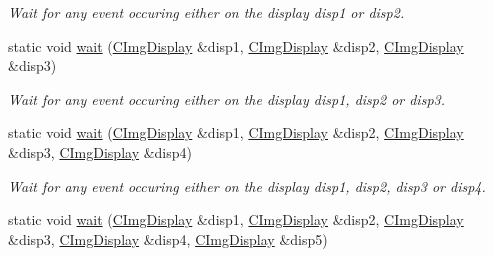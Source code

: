 \begin{DoxyCompactItemize}
\begin{DoxyCompactList}\small\item\em Wait for any event occuring either on the display {\ttfamily disp1} or {\ttfamily disp2}. \item\end{DoxyCompactList}\item 
\hypertarget{structcimg__library_1_1CImgDisplay_ace751dd163a5ea476947bcad5554035e}{
static void \hyperlink{structcimg__library_1_1CImgDisplay_ace751dd163a5ea476947bcad5554035e}{wait} (\hyperlink{structcimg__library_1_1CImgDisplay}{CImgDisplay} \&disp1, \hyperlink{structcimg__library_1_1CImgDisplay}{CImgDisplay} \&disp2, \hyperlink{structcimg__library_1_1CImgDisplay}{CImgDisplay} \&disp3)}
\label{structcimg__library_1_1CImgDisplay_ace751dd163a5ea476947bcad5554035e}

\begin{DoxyCompactList}\small\item\em Wait for any event occuring either on the display {\ttfamily disp1}, {\ttfamily disp2} or {\ttfamily disp3}. \item\end{DoxyCompactList}\item 
\hypertarget{structcimg__library_1_1CImgDisplay_a78ac24c082d4eb13d127374a4bf64987}{
static void \hyperlink{structcimg__library_1_1CImgDisplay_a78ac24c082d4eb13d127374a4bf64987}{wait} (\hyperlink{structcimg__library_1_1CImgDisplay}{CImgDisplay} \&disp1, \hyperlink{structcimg__library_1_1CImgDisplay}{CImgDisplay} \&disp2, \hyperlink{structcimg__library_1_1CImgDisplay}{CImgDisplay} \&disp3, \hyperlink{structcimg__library_1_1CImgDisplay}{CImgDisplay} \&disp4)}
\label{structcimg__library_1_1CImgDisplay_a78ac24c082d4eb13d127374a4bf64987}

\begin{DoxyCompactList}\small\item\em Wait for any event occuring either on the display {\ttfamily disp1}, {\ttfamily disp2}, {\ttfamily disp3} or {\ttfamily disp4}. \item\end{DoxyCompactList}\item 
\hypertarget{structcimg__library_1_1CImgDisplay_a205f86fcf436778bf3219c8163d33425}{
static void \hyperlink{structcimg__library_1_1CImgDisplay_a205f86fcf436778bf3219c8163d33425}{wait} (\hyperlink{structcimg__library_1_1CImgDisplay}{CImgDisplay} \&disp1, \hyperlink{structcimg__library_1_1CImgDisplay}{CImgDisplay} \&disp2, \hyperlink{structcimg__library_1_1CImgDisplay}{CImgDisplay} \&disp3, \hyperlink{structcimg__library_1_1CImgDisplay}{CImgDisplay} \&disp4, \hyperlink{structcimg__library_1_1CImgDisplay}{CImgDisplay} \&disp5)}
\label{structcimg__library_1_1CImgDisplay_a205f86fcf436778bf3219c8163d33425}


\end{DoxyCompactItemize}

